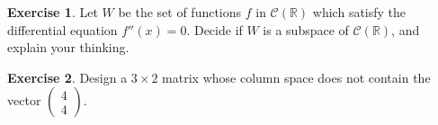 \documentclass[11pt]{amsart}
\theoremstyle{definition}
\newtheorem{exercise}{Exercise}
\begin{document}
\begin{exercise}
Let $W$ be the set of functions $f$ in $\mathcal{C}(\mathbb{R})$ which satisfy the differential equation $f''(x) = 0$. Decide if $W$ is a subspace of $\mathcal{C}(\mathbb{R})$, and explain your thinking.
\end{exercise}

\begin{exercise}
Design a $3\times 2$ matrix whose column space does not contain the vector $\begin{pmatrix} 4 \\ 4 \end{pmatrix}$.
\end{exercise}
\end{document}
